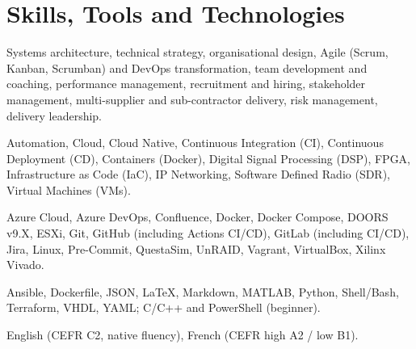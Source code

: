 %
%
\section{Skills, Tools and Technologies}
\location{}
Systems architecture, technical strategy, organisational design, Agile (Scrum, Kanban, Scrumban) and DevOps transformation, team development and coaching, performance management, recruitment and hiring, stakeholder management, multi-supplier and sub-contractor delivery, risk management, delivery leadership.

\sectionsep{}
\location{}
Automation, Cloud, Cloud Native, Continuous Integration (CI), Continuous Deployment (CD), Containers (Docker), Digital Signal Processing (DSP), FPGA, Infrastructure as Code (IaC), IP Networking, Software Defined Radio (SDR), Virtual Machines (VMs).

\sectionsep{}
\location{}
Azure Cloud, Azure DevOps, Confluence, Docker, Docker Compose, DOORS v9.X, ESXi, Git, GitHub (including Actions CI/CD), GitLab (including CI/CD), Jira, Linux, Pre-Commit, QuestaSim, UnRAID, Vagrant, VirtualBox, Xilinx Vivado.

\sectionsep{}
\location{}
Ansible, Dockerfile, JSON, \LaTeX{}, Markdown, MATLAB, Python, Shell/Bash, Terraform, VHDL, YAML; C/C++ and PowerShell (beginner).

\sectionsep{}
\location{}
English (CEFR C2, native fluency), French (CEFR high A2 / low B1).

\sectionsep{}
